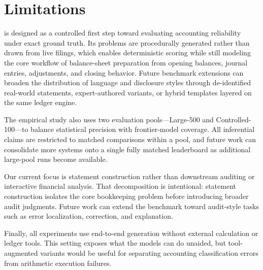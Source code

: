 \section{Limitations}

\benchmark{} is designed as a controlled first step toward evaluating
accounting reliability under exact ground truth.
Its problems are procedurally generated rather than drawn from live
filings, which enables deterministic scoring while still modeling the
core workflow of balance-sheet preparation from opening balances,
journal entries, adjustments, and closing behavior.
Future benchmark extensions can broaden the distribution of language and
disclosure styles through de-identified real-world statements,
expert-authored variants, or hybrid templates layered on the same ledger
engine.

The empirical study also uses two evaluation pools---Large-500 and
Controlled-100---to balance statistical precision with frontier-model
coverage.
All inferential claims are restricted to matched comparisons within a
pool, and future work can consolidate more systems onto a single
fully matched leaderboard as additional large-pool runs become
available.

Our current focus is statement construction rather than downstream
auditing or interactive financial analysis.
That decomposition is intentional: statement construction isolates the
core bookkeeping problem before introducing broader audit judgments.
Future work can extend the benchmark toward audit-style tasks such as
error localization, correction, and explanation.

Finally, all experiments use end-to-end generation without external
calculation or ledger tools.
This setting exposes what the models can do unaided, but tool-augmented
variants would be useful for separating accounting classification errors
from arithmetic execution failures.
